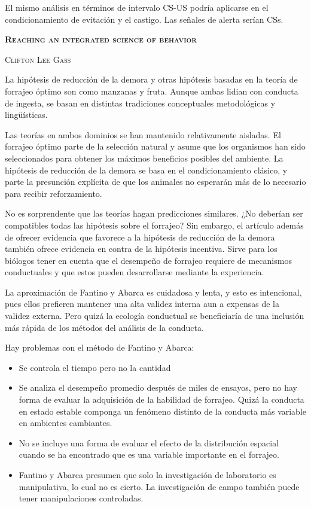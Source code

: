 \documentclass[a4paper,12pt]{article}
\begin{document}
El mismo análisis en términos de intervalo CS-US podría aplicarse en el condicionamiento de evitación y el castigo. Las señales de alerta serían CSs.

{\scshape\bfseries Reaching an integrated science of behavior}

{\scshape Clifton Lee Gass}

La hipótesis de reducción de la demora y otras hipótesis basadas en la teoría de forrajeo óptimo son como manzanas y fruta. Aunque ambas lidian con conducta de ingesta, se basan en distintas tradiciones conceptuales metodológicas y lingüísticas.

Las teorías en ambos dominios se han mantenido relativamente aisladas. El forrajeo óptimo parte de la selección natural y asume que los organismos han sido seleccionados para obtener los máximos beneficios posibles del ambiente. La hipótesis de reducción de la demora se basa en el condicionamiento clásico, y parte la presunción explícita de que los animales no esperarán más de lo necesario para recibir reforzamiento.

No es sorprendente que las teorías hagan predicciones similares. ¿No deberían ser compatibles todas las hipótesis sobre el forrajeo? Sin embargo, el artículo además de ofrecer evidencia que favorece a la hipótesis de reducción de la demora también ofrece evidencia en contra de la hipótesis incentiva. Sirve para los biólogos tener en cuenta que el desempeño de forrajeo requiere de mecanismos conductuales y que estos pueden desarrollarse mediante la experiencia.

La aproximación de Fantino y Abarca es cuidadosa y lenta, y esto es intencional, pues ellos prefieren mantener una alta validez interna aun a expensas de la validez externa. Pero quizá la ecología conductual se beneficiaría de una inclusión más rápida de los métodos del análisis de la conducta.

Hay problemas con el método de Fantino y Abarca: 
\begin{itemize}
	\item Se controla el tiempo pero no la cantidad
	\item Se analiza el desempeño promedio después de miles de ensayos, pero no hay forma de evaluar la adquisición de la habilidad de forrajeo. Quizá la conducta en estado estable componga un fenómeno distinto de la conducta más variable en ambientes cambiantes. 
	\item No se incluye una forma de evaluar el efecto de la distribución espacial cuando se ha encontrado que es una variable importante en el forrajeo.
	\item Fantino y Abarca presumen que solo la investigación de laboratorio es manipulativa, lo cual no es cierto. La investigación de campo también puede tener manipulaciones controladas.
\end{itemize}
\end{document}
